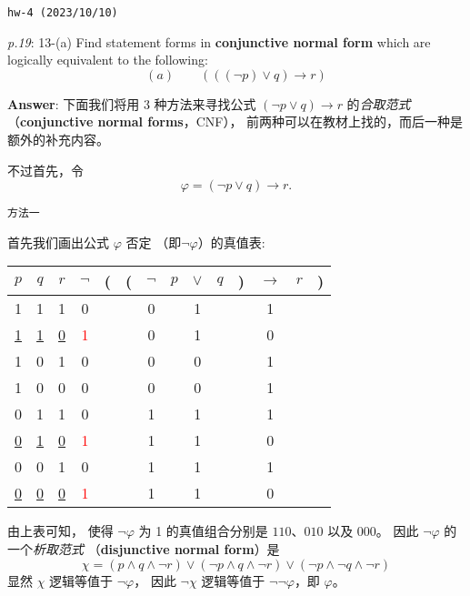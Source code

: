 \documentclass[UTF8,12pt,a4paper]{ctexart}
\begin{document}
\noindent\texttt{hw-4 (2023/10/10)}

\emph{p.19}: 13-(a) \quad
Find statement forms in \textbf{conjunctive normal form} which are logically equivalent to the following:
\[
(a) \qquad (((\neg p)  \lor q) \to r)
\] 

\noindent\textbf{Answer}: 
下面我们将用 3 种方法来寻找公式 $(\neg p \lor q) \to r$ 的\textit{合取范式} （\textbf{conjunctive normal forms}，CNF），
前两种可以在教材上找的，而后一种是额外的补充内容。

不过首先，令 
\[
\varphi = (\neg p \lor q) \to r.
\]

\noindent\texttt{方法一}

首先我们画出公式 $\varphi$ {\color{red} 否定} （即$\neg\varphi$）的真值表:
\begin{center}
	\begin{tabular}{@{ }c@{ }@{ }c@{ }@{ }c | c@{ }@{}c@{}@{}c@{}@{ }c@{ }@{ }c@{ }@{ }c@{ }@{ }c@{ }@{}c@{}@{ }c@{ }@{ }c@{ }@{}c@{ }}
		$p$ & $q$ & $r$ & {\color{red} $\lnot$} & ( & ( & $\lnot$ & $p$ & $\lor$ & $q$ & ) & $\rightarrow$ & $r$ & )\\
		\hline 
		1 & 1 & 1 & 0 &  &  & 0 &  & 1 &  &  & 1 &  & \\
		\underline{1} & \underline{1} & \underline{0} & \textcolor{red}{1} &  &  & 0 &  & 1 &  &  & 0 &  & \\
		1 & 0 & 1 & 0 &  &  & 0 &  & 0 &  &  & 1 &  & \\
		1 & 0 & 0 & 0 &  &  & 0 &  & 0 &  &  & 1 &  & \\
		0 & 1 & 1 & 0 &  &  & 1 &  & 1 &  &  & 1 &  & \\
		\underline{0} & \underline{1} & \underline{0} & \textcolor{red}{1} &  &  & 1 &  & 1 &  &  & 0 &  & \\
		0 & 0 & 1 & 0 &  &  & 1 &  & 1 &  &  & 1 &  & \\
		\underline{0} & \underline{0} & \underline{0} & \textcolor{red}{1} &  &  & 1 &  & 1 &  &  & 0 &  & \\
	\end{tabular}
\end{center}

由上表可知，
使得 $\neg \varphi$ 为 1 的真值组合分别是
$110$、$010$ 以及 $000$。
因此  $\neg \varphi$ 的一个\textit{析取范式} 
（\textbf{disjunctive normal form}）是
\[
\chi = (p \land q \land \neg r) \lor (\neg p \land q \land \neg r) \lor (\neg p \land  \neg q \land \neg r)
\] 
显然 $\chi$ 逻辑等值于 $\neg \varphi$，
因此 $\neg \chi $ 逻辑等值于 $ \neg \neg \varphi$，即 $\varphi$。
\end{document}
